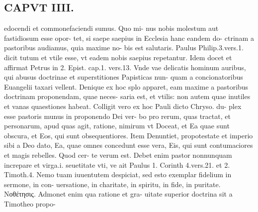 \documentclass{article}
\begin{document}
\begin{pages}
\section*{CAPVT  IIII. }
\marginpar{[ p.227 ]}\pstart edocendi et commonefaciendi sumus. Quo mi- nus nobis molestum aut fastidiosum esse opor- tet, si saepe saepius in Ecclesia hanc eandem do- ctrinam a pastoribus audiamus, quia maxime no- bis est salutaris. Paulus Philip.3.vers.1. dicit tutum et vtile esse, vt eadem nobis saepius repetantur. Idem docet et affirmat Petrus in 2. Epist. cap.1. vers.13. Vnde vae delicatis hominum auribus, qui abusus doctrinae et superstitiones Papisticas nun- quam a concionatoribus Euangelii taxari vellent.  \pend\pstart Denique ex hoc splo apparet, eam maxime a pastoribus doctrinam proponendam, quae neces- saria est, et vtilis: non autem quae inutiles et vanas quaestiones habeat.  \pend\pstart Colligit vero ex hoc Pauli dicto Chryso. du- plex esse pastoris munus in proponendo Dei ver- bo pro rerum, quas tractat, et personarum, apud quas agit, ratione, nimirum vt Doceat, et Ea quae sunt obscura, et Eos, qui sunt obsequentiores. Item Denuntiet, propotestate et imperio sibi a Deo dato, Ea, quae omnes concedunt esse vera, Eis, qui sunt contumaciores et magis rebelles. Quod cer- te verum est. Debet enim pastor nonnunquam increpare et virga.i. seuetitate vti, ve ait Paulus 1. Corinth 4.vers.21. et 2. Timoth.4.  \pend{} Nemo tuam iuuentutem despiciat, sed esto exemplar fidelium in sermone, in con- uersatione, in charitate, in spiritu, in fide, in puritate.  \pend\pstart Νοθέτησις. Admonet enim qua ratione et gra- uitate superior doctrina sit a Timotheo propo-  \pend

\end{pages}
\end{document}
